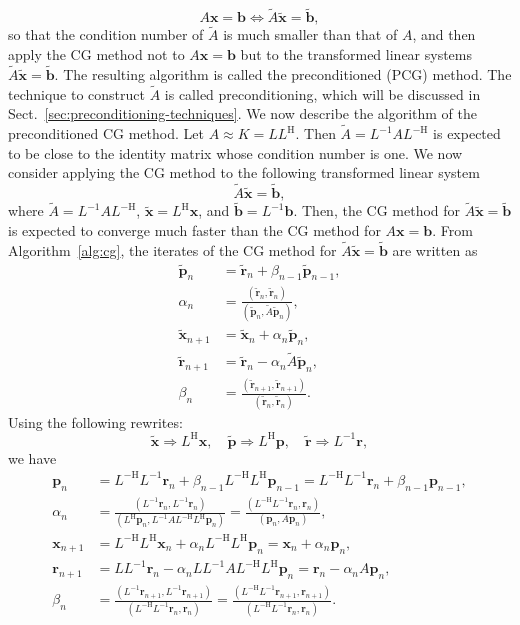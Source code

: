 \[A\bm x=\bm b\Leftrightarrow\widetilde A\widetilde{\bm x}=\widetilde{\bm b},\]
{so that the condition number of $\widetilde A$ is much smaller than that of $A$, and then apply the CG method not to $A\bm x=\bm b$ but to the transformed linear systems $\widetilde A\widetilde{\bm x}=\widetilde{\bm b}$. The resulting algorithm is called the preconditioned (PCG) method. The technique to construct $\widetilde A$ is called preconditioning, which will be discussed in Sect.\ \ref{sec:preconditioning-techniques}.}
{We now describe the algorithm of the preconditioned CG method. Let $A\approx K=LL^{\mathrm H}$. Then $\widetilde A=L^{-1}AL^{-\mathrm H}$ is expected to be close to the identity matrix whose condition number is one. We now consider applying the CG method to the following transformed linear system}
\[\widetilde A\widetilde{\bm x}=\widetilde{\bm b},\]
{where $\widetilde A=L^{-1}AL^{-\mathrm H}$, $\widetilde{\bm x}=L^{\mathrm H}\bm x$, and $\widetilde{\bm b}=L^{-1}\bm b$. Then, the CG method for $\widetilde A\widetilde{\bm x}=\widetilde{\bm b}$ is expected to converge much faster than the CG method for $A\bm x=\bm b$. From Algorithm\ \ref{alg:cg}, the iterates of the CG method for $\widetilde A\widetilde{\bm x}=\widetilde{\bm b}$ are written as}
\[\begin{aligned}
\widetilde{\bm p}_n&=\widetilde{\bm r}_n+\beta_{n-1}\widetilde{\bm p}_{n-1},\\
\alpha_n&=\frac{(\widetilde{\bm r}_n,\widetilde{\bm r}_n)}{(\widetilde{\bm p}_n,\widetilde A\widetilde{\bm p}_n)},\\
\widetilde{\bm x}_{n+1}&=\widetilde{\bm x}_n+\alpha_n\widetilde{\bm p}_n,\\
\widetilde{\bm r}_{n+1}&=\widetilde{\bm r}_n-\alpha_n\widetilde A\widetilde{\bm p}_n,\\
\beta_n&=\frac{(\widetilde{\bm r}_{n+1},\widetilde{\bm r}_{n+1})}{(\widetilde{\bm r}_n,\widetilde{\bm r}_n)}.
\end{aligned}\]
{Using the following rewrites:}
\[\widetilde{\bm x}\Rightarrow L^{\mathrm H}\bm x,\quad\widetilde{\bm p}\Rightarrow L^{\mathrm H}\bm p,\quad\widetilde{\bm r}\Rightarrow L^{-1}\bm r,\]
{we have}
\[\begin{aligned}
\bm p_n&=L^{-\mathrm H}L^{-1}\bm r_n+\beta_{n-1}L^{-\mathrm H}L^{\mathrm H}\bm p_{n-1}=L^{-\mathrm H}L^{-1}\bm r_n+\beta_{n-1}\bm p_{n-1},\\
\alpha_n&=\frac{(L^{-1}\bm r_n,L^{-1}\bm r_n)}{(L^{\mathrm H}\bm p_n,L^{-1}AL^{-\mathrm H}L^{\mathrm H}\bm p_n)}=\frac{(L^{-\mathrm H}L^{-1}\bm r_n,\bm r_n)}{(\bm p_n,A\bm p_n)},\\
\bm x_{n+1}&=L^{-\mathrm H}L^{\mathrm H}\bm x_n+\alpha_nL^{-\mathrm H}L^{\mathrm H}\bm p_n=\bm x_n+\alpha_n\bm p_n,\\
\bm r_{n+1}&=LL^{-1}\bm r_n-\alpha_nLL^{-1}AL^{-\mathrm H}L^{\mathrm H}\bm p_n=\bm r_n-\alpha_nA\bm p_n,\\
\beta_n&=\frac{(L^{-1}\bm r_{n+1},L^{-1}\bm r_{n+1})}{(L^{-\mathrm H}L^{-1}\bm r_n,\bm r_n)}=\frac{(L^{-\mathrm H}L^{-1}\bm r_{n+1},\bm r_{n+1})}{(L^{-\mathrm H}L^{-1}\bm r_n,\bm r_n)}.
\end{aligned}\]
